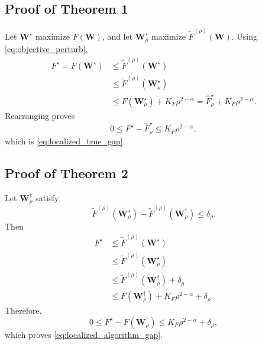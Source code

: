 \subsection{Proof of Theorem 1}

Let $\mathbf{W}^{\star}$ maximize $F(\mathbf{W})$, and let $\mathbf{W}_{\rho}^{\star}$ maximize $\widetilde{F}^{(\rho)}(\mathbf{W})$. Using \eqref{eq:objective_perturb},
\begin{align}
F^{\star}
=
F(\mathbf{W}^{\star})
&\le
\widetilde{F}^{(\rho)}(\mathbf{W}^{\star}) \nonumber \\
&\le
\widetilde{F}^{(\rho)}(\mathbf{W}_{\rho}^{\star}) \nonumber \\
&\le
F(\mathbf{W}_{\rho}^{\star}) + K_F \rho^{2-\alpha}
=
\widehat{F}_{\rho}^{\star} + K_F \rho^{2-\alpha}.
\end{align}
Rearranging proves
\begin{equation}
0 \le F^{\star} - \widehat{F}_{\rho}^{\star} \le K_F \rho^{2-\alpha},
\end{equation}
which is \eqref{eq:localized_true_gap}.

\subsection{Proof of Theorem 2}

Let $\mathbf{W}_{\rho}^{\dagger}$ satisfy
\begin{equation}
\widetilde{F}^{(\rho)}(\mathbf{W}_{\rho}^{\star}) -
\widetilde{F}^{(\rho)}(\mathbf{W}_{\rho}^{\dagger}) \le \delta_{\rho}.
\end{equation}
Then
\begin{align}
F^{\star}
&\le
\widetilde{F}^{(\rho)}(\mathbf{W}^{\star}) \nonumber \\
&\le
\widetilde{F}^{(\rho)}(\mathbf{W}_{\rho}^{\star}) \nonumber \\
&\le
\widetilde{F}^{(\rho)}(\mathbf{W}_{\rho}^{\dagger}) + \delta_{\rho} \nonumber \\
&\le
F(\mathbf{W}_{\rho}^{\dagger}) + K_F \rho^{2-\alpha} + \delta_{\rho}.
\end{align}
Therefore,
\begin{equation}
0 \le F^{\star} - F(\mathbf{W}_{\rho}^{\dagger})
\le
K_F \rho^{2-\alpha} + \delta_{\rho},
\end{equation}
which proves \eqref{eq:localized_algorithm_gap}.
